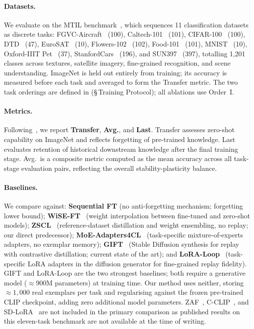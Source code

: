 \documentclass{article}
\begin{document}
  \paragraph{Datasets.}
  We evaluate on the MTIL benchmark~\cite{zheng2023zscl}, which sequences 11
  classification datasets as discrete tasks: FGVC-Aircraft~\cite{maji2013fine}
  (100), Caltech-101~\cite{fei2004learning} (101), CIFAR-100~\cite{krizhevsky2009learning}
  (100), DTD~\cite{cimpoi2014describing} (47), EuroSAT~\cite{helber2019eurosat}
  (10), Flowers-102~\cite{nilsback2008automated} (102), Food-101~\cite{bossard2014food}
  (101), MNIST~\cite{lecun1998gradient} (10), Oxford-IIIT Pet~\cite{parkhi2012cats}
  (37), StanfordCars~\cite{krause2013collecting} (196), and SUN397~\cite{xiao2010sun}
  (397), totalling 1{,}201 classes across textures, satellite imagery, fine-grained
  recognition, and scene understanding. ImageNet is held out entirely from
  training; its accuracy is measured before each task and averaged to form the
  Transfer metric. The two task orderings are defined in
   (\S\,Training Protocol); all ablations use Order~I.

  \paragraph{Metrics.}
  Following~\cite{zheng2023zscl}, we report \textbf{Transfer}, \textbf{Avg.}, and
  \textbf{Last}. Transfer assesses zero-shot capability on ImageNet and reflects
  forgetting of pre-trained knowledge. Last evaluates retention of historical
  downstream knowledge after the final training stage. Avg.\ is a composite metric
  computed as the mean accuracy across all task-stage evaluation pairs, reflecting
  the overall stability-plasticity balance.

  \paragraph{Baselines.}
  We compare against: \textbf{Sequential FT} (no anti-forgetting mechanism;
  forgetting lower bound); \textbf{WiSE-FT}~\cite{wortsman2022wiseft} (weight
  interpolation between fine-tuned and zero-shot models);
  \textbf{ZSCL}~\cite{zheng2023zscl} (reference-dataset distillation and weight
  ensembling, no replay; our direct predecessor);
  \textbf{MoE-Adapters4CL}~\cite{yu2024moe} (task-specific mixture-of-experts
  adapters, no exemplar memory); \textbf{GIFT}~\cite{gift2025} (Stable Diffusion
  synthesis for replay with contrastive distillation; current state of the art);
  and \textbf{LoRA-Loop}~\cite{loraloop2025} (task-specific LoRA adapters in the
  diffusion generator for fine-grained replay fidelity). GIFT and LoRA-Loop are
  the two strongest baselines; both require a generative model
  (${\approx}900$M parameters) at training time. Our method uses neither, storing
  ${\approx}1{,}000$ real exemplars per task and regularising against the frozen
  pre-trained CLIP checkpoint, adding zero additional model parameters.
  ZAF~\citep{gao2024zaf}, C-CLIP~\citep{liu2025cclip}, and
  SD-LoRA~\citep{wu2025sdlora} are not included in the primary comparison as
  published results on this eleven-task benchmark are not available at the time
  of writing.
\end{document}
